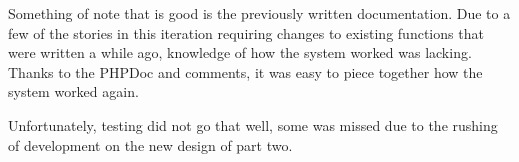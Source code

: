 Something of note that is good is the previously written documentation. Due to a few of the stories in this iteration requiring changes to existing functions that were written a while ago, knowledge of how the system worked was lacking. Thanks to the PHPDoc and comments, it was easy to piece together how the system worked again.

Unfortunately, testing did not go that well, some was missed due to the rushing of development on the new design of part two.
\newpage
